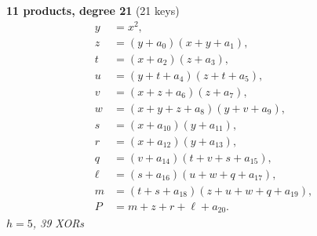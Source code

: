 \medskip
\noindent
\begin{minipage}[t]{\textwidth}
\textbf{11 products, degree 21} (21 keys)
\[
\begin{aligned}
y &= x^2,\\
z &= (y+a_0)(x+y+a_1),\\
t &= (x+a_2)(z+a_3),\\
u &= (y+t+a_4)(z+t+a_5),\\
v &= (x+z+a_6)(z+a_7),\\
w &= (x+y+z+a_8)(y+v+a_9),\\
s &= (x+a_{10})(y+a_{11}),\\
r &= (x+a_{12})(y+a_{13}),\\
q &= (v+a_{14})(t+v+s+a_{15}),\\
\ell &= (s+a_{16})(u+w+q+a_{17}),\\
m &= (t+s+a_{18})(z+u+w+q+a_{19}),\\
P &= m+z+r+\ell+a_{20}.
\end{aligned}
\]
\emph{$h=5$, 39 XORs}
\end{minipage}

